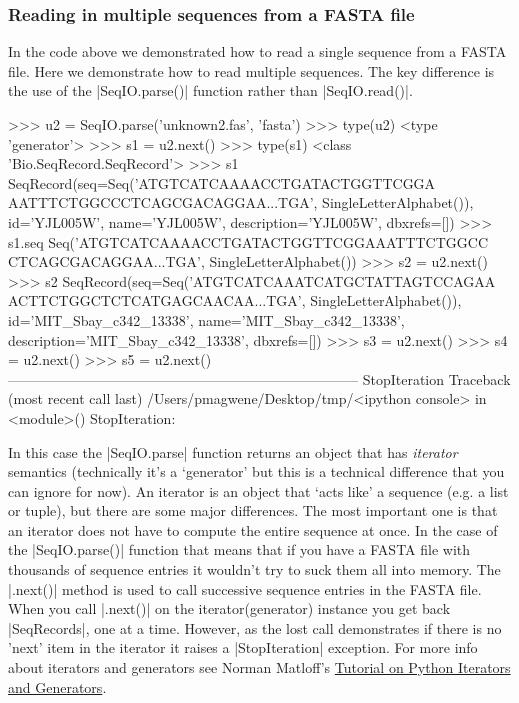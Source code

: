 \subsubsection{Reading in multiple sequences from a FASTA file}

In the code above we demonstrated how to read a single sequence from a FASTA file.  Here we demonstrate how to read multiple sequences.  The key difference is the use of the |SeqIO.parse()| function rather than |SeqIO.read()|.

\begin{python}
>>> u2 = SeqIO.parse('unknown2.fas', 'fasta')
>>> type(u2)
<type 'generator'>
>>> s1 = u2.next()
>>> type(s1)
<class 'Bio.SeqRecord.SeqRecord'>
>>> s1
SeqRecord(seq=Seq('ATGTCATCAAAACCTGATACTGGTTCGGA
AATTTCTGGCCCTCAGCGACAGGAA...TGA', SingleLetterAlphabet()),
id='YJL005W', name='YJL005W', description='YJL005W', dbxrefs=[])
>>> s1.seq
Seq('ATGTCATCAAAACCTGATACTGGTTCGGAAATTTCTGGCC
CTCAGCGACAGGAA...TGA', SingleLetterAlphabet())
>>> s2 = u2.next()
>>> s2
SeqRecord(seq=Seq('ATGTCATCAAATCATGCTATTAGTCCAGAA
ACTTCTGGCTCTCATGAGCAACAA...TGA', SingleLetterAlphabet()),
id='MIT_Sbay_c342_13338', name='MIT_Sbay_c342_13338',
description='MIT_Sbay_c342_13338', dbxrefs=[])
>>> s3 = u2.next()
>>> s4 = u2.next()
>>> s5 = u2.next()
---------------------------------------------------------------------------
StopIteration                             Traceback (most recent call last)
/Users/pmagwene/Desktop/tmp/<ipython console> in <module>()
StopIteration:
\end{python}

In this case the |SeqIO.parse| function returns an object that has \emph{iterator} semantics (technically it's a `generator' but this is a technical difference that you can ignore for now). An iterator is an object that `acts like' a sequence (e.g. a list or tuple), but there are some major differences. The most important one is that an iterator does not have to compute the entire sequence at once. In the case of the |SeqIO.parse()| function that means that if you have a FASTA file with thousands of sequence entries it wouldn't try to suck them all into memory. The |.next()| method is used to call successive sequence entries in the FASTA file. When you call |.next()| on the iterator(generator) instance you get back |SeqRecords|, one at a time. However, as the lost call demonstrates if there is no 'next' item in the iterator it raises a |StopIteration| exception. For more info about iterators and generators see Norman Matloff's  \href{https://github.com/pmagwene/Bio313/raw/master/lecture-13/PyIterGen.pdf}{Tutorial on Python Iterators and Generators}.

